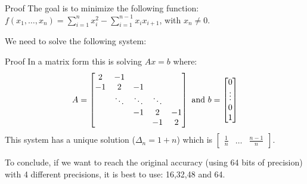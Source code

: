 \documentclass{beamer}
\begin{document}
\begin{frame}{Proof}
  The goal is to minimize the following function: $f(x_1,\dots,x_n) = \sum\limits_{i=1}^n x_i^2 - \sum\limits_{i=1}^{n-1} x_ix_{i+1}$\pause, with $x_n \neq 0$.\pause
  
\vspace{0.7cm}
We need to solve the following system:
\end{frame}

\begin{frame}{Proof}
 In a matrix form this is solving $Ax=b$ where:\[ A = \begin{bmatrix}
    2       & -1 &  &  &  \\
    -1       & 2 & -1 &  &  \\
    & \ddots & \ddots & \ddots & \\
    & & -1 & 2 & -1 \\
           &  &  & -1 & 2
\end{bmatrix} \textup{ and } b = \begin{bmatrix} 0 \\ \vdots \\ 0 \\ 1 \end{bmatrix} \]
\pause
This system has a unique solution ($\Delta_n = 1+n$) which is $\begin{bmatrix} \frac{1}{n} & \dots & \frac{n-1}{n} \end{bmatrix}$.

\vspace{0.5cm}
To conclude, if we want to reach the original accuracy (using 64 bits of precision) with 4 different precisions, it is best to use: 16,32,48 and 64.
\end{frame}
\end{document}
